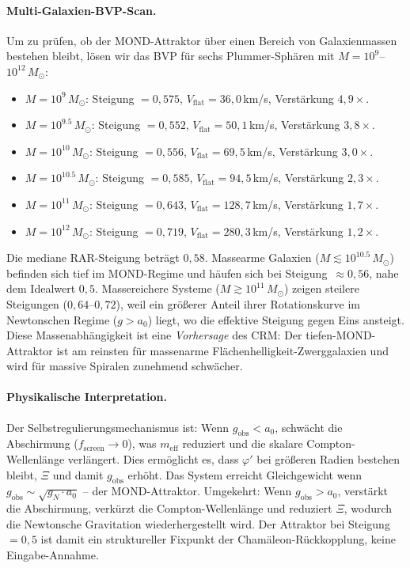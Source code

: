 \documentclass[aps,prd,twocolumn,superscriptaddress,nofootinbib]{revtex4-2}
\begin{document}
\paragraph{Multi-Galaxien-BVP-Scan.}
Um zu pr\"ufen, ob der MOND-Attraktor \"uber einen Bereich von Galaxienmassen bestehen bleibt, l\"osen wir das BVP f\"ur sechs Plummer-Sph\"aren mit $M = 10^9$--$10^{12}\,M_\odot$:
\begin{itemize}
\item $M = 10^{9}\,M_\odot$: Steigung $= 0{,}575$, $V_{\mathrm{flat}} = 36{,}0$\,km/s, Verst\"arkung $4{,}9\times$.
\item $M = 10^{9.5}\,M_\odot$: Steigung $= 0{,}552$, $V_{\mathrm{flat}} = 50{,}1$\,km/s, Verst\"arkung $3{,}8\times$.
\item $M = 10^{10}\,M_\odot$: Steigung $= 0{,}556$, $V_{\mathrm{flat}} = 69{,}5$\,km/s, Verst\"arkung $3{,}0\times$.
\item $M = 10^{10.5}\,M_\odot$: Steigung $= 0{,}585$, $V_{\mathrm{flat}} = 94{,}5$\,km/s, Verst\"arkung $2{,}3\times$.
\item $M = 10^{11}\,M_\odot$: Steigung $= 0{,}643$, $V_{\mathrm{flat}} = 128{,}7$\,km/s, Verst\"arkung $1{,}7\times$.
\item $M = 10^{12}\,M_\odot$: Steigung $= 0{,}719$, $V_{\mathrm{flat}} = 280{,}3$\,km/s, Verst\"arkung $1{,}2\times$.
\end{itemize}
Die mediane RAR-Steigung betr\"agt $0{,}58$. Massearme Galaxien ($M \lesssim 10^{10.5}\,M_\odot$) befinden sich tief im MOND-Regime und h\"aufen sich bei Steigung~$\approx 0{,}56$, nahe dem Idealwert $0{,}5$. Massereichere Systeme ($M \gtrsim 10^{11}\,M_\odot$) zeigen steilere Steigungen ($0{,}64$--$0{,}72$), weil ein gr\"o\ss{}erer Anteil ihrer Rotationskurve im Newtonschen Regime ($g > a_0$) liegt, wo die effektive Steigung gegen Eins ansteigt. Diese Massenabh\"angigkeit ist eine \textit{Vorhersage} des CRM: Der tiefen-MOND-Attraktor ist am reinsten f\"ur massenarme Fl\"achenhelligkeit-Zwerggalaxien und wird f\"ur massive Spiralen zunehmend schw\"acher.

\paragraph{Physikalische Interpretation.}
Der Selbstregulierungsmechanismus ist: Wenn $g_{\mathrm{obs}} < a_0$, schw\"acht die Abschirmung ($f_{\mathrm{screen}} \to 0$), was $m_{\mathrm{eff}}$ reduziert und die skalare Compton-Wellenl\"ange verl\"angert. Dies erm\"oglicht es, dass $\varphi'$ bei gr\"o\ss{}eren Radien bestehen bleibt, $\Xi$ und damit $g_{\mathrm{obs}}$ erh\"oht. Das System erreicht Gleichgewicht wenn $g_{\mathrm{obs}} \sim \sqrt{g_N \cdot a_0}$ -- der MOND-Attraktor. Umgekehrt: Wenn $g_{\mathrm{obs}} > a_0$, verst\"arkt die Abschirmung, verk\"urzt die Compton-Wellenl\"ange und reduziert $\Xi$, wodurch die Newtonsche Gravitation wiederhergestellt wird. Der Attraktor bei Steigung~$= 0{,}5$ ist damit ein struktureller Fixpunkt der Cham\"aleon-R\"uckkopplung, keine Eingabe-Annahme.
\end{document}
